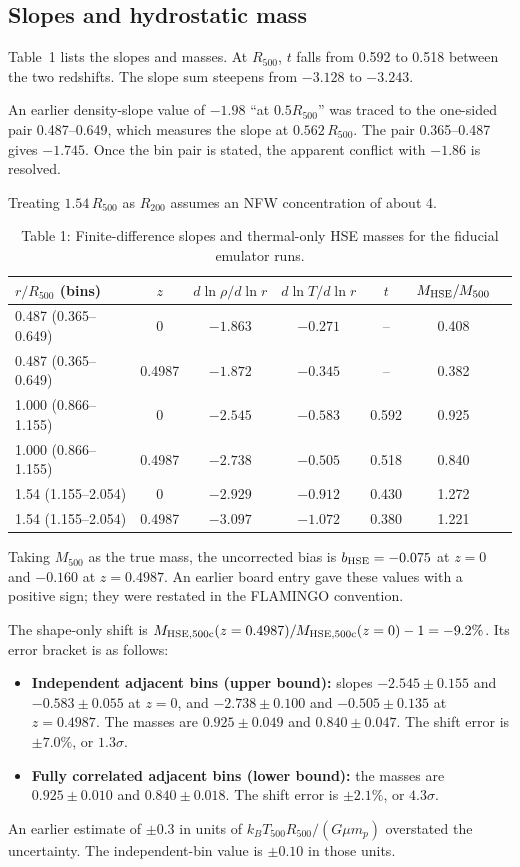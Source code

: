 \documentclass[11pt,a4paper]{article}
\begin{document}
\subsection{Slopes and hydrostatic mass}
Table~1 lists the slopes and masses. At $R_{500}$, $t$ falls from 0.592 to 0.518 between the two redshifts. The slope sum steepens from $-3.128$ to $-3.243$.

An earlier density-slope value of $-1.98$ ``at $0.5R_{500}$'' was traced to the one-sided pair 0.487--0.649, which measures the slope at $0.562\,R_{500}$. The pair 0.365--0.487 gives $-1.745$. Once the bin pair is stated, the apparent conflict with $-1.86$ is resolved.

Treating $1.54\,R_{500}$ as $R_{200}$ assumes an NFW concentration of about 4.

\begin{table}
\centering
\begin{tabular}{lcccccc}
\toprule
$r/R_{500}$ (bins) & $z$ & $d\ln\rho/d\ln r$ & $d\ln T/d\ln r$ & $t$ & $M_{\rm HSE}/M_{500}$ \\
\midrule
0.487 (0.365--0.649) & 0 & $-1.863$ & $-0.271$ & -- & 0.408 \\
0.487 (0.365--0.649) & 0.4987 & $-1.872$ & $-0.345$ & -- & 0.382 \\
1.000 (0.866--1.155) & 0 & $-2.545$ & $-0.583$ & 0.592 & 0.925 \\
1.000 (0.866--1.155) & 0.4987 & $-2.738$ & $-0.505$ & 0.518 & 0.840 \\
1.54 (1.155--2.054) & 0 & $-2.929$ & $-0.912$ & 0.430 & 1.272 \\
1.54 (1.155--2.054) & 0.4987 & $-3.097$ & $-1.072$ & 0.380 & 1.221 \\
\bottomrule
\end{tabular}
\caption*{Table 1: Finite-difference slopes and thermal-only HSE masses for the fiducial emulator runs.}
\end{table}

Taking $M_{500}$ as the true mass, the uncorrected bias is $b_{\rm HSE}=-0.075$ at $z=0$ and $-0.160$ at $z=0.4987$. An earlier board entry gave these values with a positive sign; they were restated in the FLAMINGO convention.

The shape-only shift is $M_{\rm HSE,500c}(z=0.4987)/M_{\rm HSE,500c}(z=0)-1=-9.2\%$. Its error bracket is as follows:
\begin{itemize}
\item \textbf{Independent adjacent bins (upper bound):} slopes $-2.545\pm0.155$ and $-0.583\pm0.055$ at $z=0$, and $-2.738\pm0.100$ and $-0.505\pm0.135$ at $z=0.4987$. The masses are $0.925\pm0.049$ and $0.840\pm0.047$. The shift error is $\pm7.0\%$, or $1.3\sigma$.
\item \textbf{Fully correlated adjacent bins (lower bound):} the masses are $0.925\pm0.010$ and $0.840\pm0.018$. The shift error is $\pm2.1\%$, or $4.3\sigma$.
\end{itemize}
An earlier estimate of $\pm0.3$ in units of $k_BT_{500}R_{500}/(G\mu m_p)$ overstated the uncertainty. The independent-bin value is $\pm0.10$ in those units.
\end{document}
